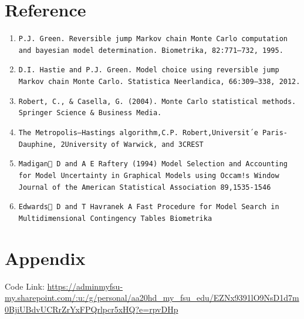 \documentclass[12pt,a4paper]{article}
\begin{document}
\section{Reference}
\begin{enumerate}
    \item \texttt{P.J. Green. Reversible jump Markov chain Monte Carlo computation and bayesian model
determination. Biometrika, 82:771–732, 1995.}
  \item  \texttt{D.I. Hastie and P.J. Green. Model choice using reversible jump Markov chain Monte Carlo.
Statistica Neerlandica, 66:309–338, 2012.}
\item \texttt{Robert, C., & Casella, G. (2004). Monte Carlo statistical methods. Springer Science &
Business Media.}
\item \texttt{The Metropolis–Hastings algorithm,C.P. Robert,Universit´e Paris-Dauphine, 2University of Warwick, and 3CREST}
\item \texttt{Madigan D and A E Raftery (1994)	Model Selection and Accounting for Model Uncertainty in
Graphical Models using Occam!s Window Journal of the American Statistical Association 89,1535-1546}
\item \texttt{Edwards D and T Havranek A Fast Procedure for Model Search in Multidimensional Contingency Tables Biometrika}
\end{enumerate}

\section{Appendix}
Code Link:
\newline
\url{https://adminmyfsu-my.sharepoint.com/:u:/g/personal/aa20hd_my_fsu_edu/EZNx9391lO9NsD1d7m0BjiUBdvUCRrZrYxFPQrlpcr5xHQ?e=rpvDHp}
\end{document}
